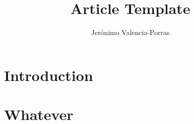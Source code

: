 \documentclass[a4paper,11pt]{amsart}
\title{Article Template}
\author{Jerónimo Valencia-Porras}
\theoremstyle{definition}
\theoremstyle{definition}
\theoremstyle{definition}
\theoremstyle{remark}
\theoremstyle{definition}
\theoremstyle{definition}
\begin{document}
\maketitle
\vspace{-0.5cm}
\begin{abstract}
    \lipsum[1-1]
\end{abstract}

\section{Introduction}
\lipsum[2-2]

\section{Whatever}
\lipsum[3-4]
\end{document}

